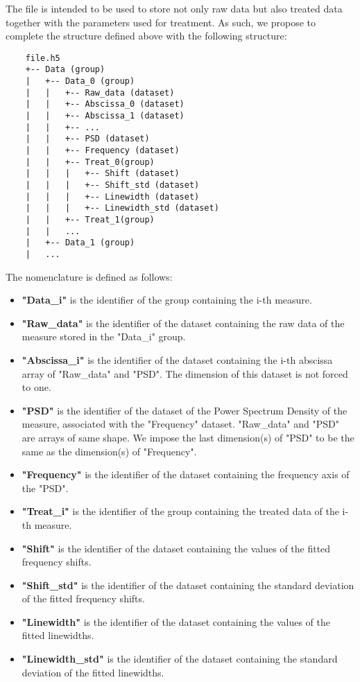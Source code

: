 The file is intended to be used to store not only raw data but also treated data together with the parameters used for treatment. As such, we propose to complete the structure defined above with the following structure:

\begin{verbatim}
    file.h5
    +-- Data (group)
    |   +-- Data_0 (group)
    |   |   +-- Raw_data (dataset)
    |   |   +-- Abscissa_0 (dataset)
    |   |   +-- Abscissa_1 (dataset)
    |   |   +-- ...
    |   |   +-- PSD (dataset)
    |   |   +-- Frequency (dataset)
    |   |   +-- Treat_0(group)
    |   |   |   +-- Shift (dataset)
    |   |   |   +-- Shift_std (dataset)
    |   |   |   +-- Linewidth (dataset)
    |   |   |   +-- Linewidth_std (dataset)
    |   |   +-- Treat_1(group)
    |   |   ...
    |   +-- Data_1 (group)
    |   ...
\end{verbatim}

The nomenclature is defined as follows:
\begin{itemize}
    \item \textbf{"Data\_i"} is the identifier of the group containing the i-th measure.
    \item \textbf{"Raw\_data"} is the identifier of the dataset containing the raw data of the measure stored in the "Data\_i" group.
    \item \textbf{"Abscissa\_i"} is the identifier of the dataset containing the i-th abscissa array of "Raw\_data" and "PSD". The dimension of this dataset is not forced to one.
    \item \textbf{"PSD"} is the identifier of the dataset of the Power Spectrum Density of the measure, associated with the "Frequency" dataset. "Raw\_data" and "PSD" are arrays of same shape. We impose the last dimension(s) of "PSD" to be the same as the dimension(s) of "Frequency".
    \item \textbf{"Frequency"} is the identifier of the dataset containing the frequency axis of the "PSD".
    \item \textbf{"Treat\_i"} is the identifier of the group containing the treated data of the i-th measure.
    \item \textbf{"Shift"} is the identifier of the dataset containing the values of the fitted frequency shifts.
    \item \textbf{"Shift\_std"} is the identifier of the dataset containing the standard deviation of the fitted frequency shifts.
    \item \textbf{"Linewidth"} is the identifier of the dataset containing the values of the fitted linewidths.
    \item \textbf{"Linewidth\_std"} is the identifier of the dataset containing the standard deviation of the fitted linewidths.  
\end{itemize}
